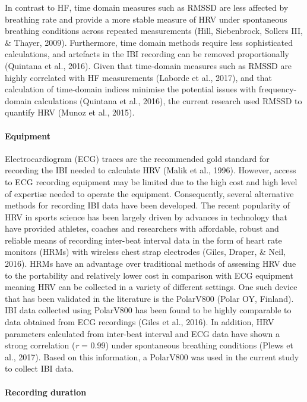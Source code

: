 \documentclass[man,floatsintext]{apa6}
\let\oldparagraph\paragraph
\renewcommand{\paragraph}[1]{\oldparagraph{#1}\mbox{}}
\begin{document}
In contrast to HF, time domain measures such as RMSSD are less affected by breathing rate and provide a more stable measure of HRV under spontaneous breathing conditions across repeated measurements (Hill, Siebenbrock, Sollers III, \& Thayer, 2009).
Furthermore, time domain methods require less sophisticated calculations, and artefacts in the IBI recording can be removed proportionally (Quintana et al., 2016).
Given that time-domain measures such as RMSSD are highly correlated with HF measurements (Laborde et al., 2017), and that calculation of time-domain indices minimise the potential issues with frequency-domain calculations (Quintana et al., 2016), the current research used RMSSD to quantify HRV (Munoz et al., 2015).

\hypertarget{equipment}{%
\paragraph{Equipment}\label{equipment}}

Electrocardiogram (ECG) traces are the recommended gold standard for recording the IBI needed to calculate HRV (Malik et al., 1996).
However, access to ECG recording equipment may be limited due to the high cost and high level of expertise needed to operate the equipment.
Consequently, several alternative methods for recording IBI data have been developed.
The recent popularity of HRV in sports science has been largely driven by advances in technology that have provided athletes, coaches and researchers with affordable, robust and reliable means of recording inter-beat interval data in the form of heart rate monitors (HRMs) with wireless chest strap electrodes (Giles, Draper, \& Neil, 2016).
HRMs have an advantage over traditional methods of assessing HRV due to the portability and relatively lower cost in comparison with ECG equipment meaning HRV can be collected in a variety of different settings.
One such device that has been validated in the literature is the PolarV800 (Polar OY, Finland).
IBI data collected using PolarV800 has been found to be highly comparable to data obtained from ECG recordings (Giles et al., 2016).
In addition, HRV parameters calculated from inter-beat interval and ECG data have shown a strong correlation (\emph{r} = 0.99) under spontaneous breathing conditions (Plews et al., 2017).
Based on this information, a PolarV800 was used in the current study to collect IBI data.

\hypertarget{recording-duration}{%
\paragraph{Recording duration}\label{recording-duration}}
\end{document}
